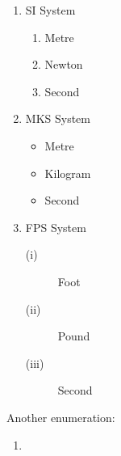 \documentclass[11pt,a4paper]{article}
\begin{document}
    \vspace{\fill}

    \begin{enumerate}[leftmargin = 50mm]
        \item SI System
        \begin{enumerate} 
            \item Metre 
            \item Newton
            \item Second 
        \end{enumerate}
        \item MKS System 
        \begin{itemize}
            \item Metre 
            \item Kilogram 
            \item Second 
        \end{itemize}
        \item FPS System 
        \begin{description}
            \item[(i)] Foot 
            \item[(ii)] Pound 
            \item[(iii)] Second
        \end{description}
    \end{enumerate}
    \vspace{20mm}
    Another enumeration:
    \begin{enumerate}
        \item 
    \end{enumerate}
\end{document}
